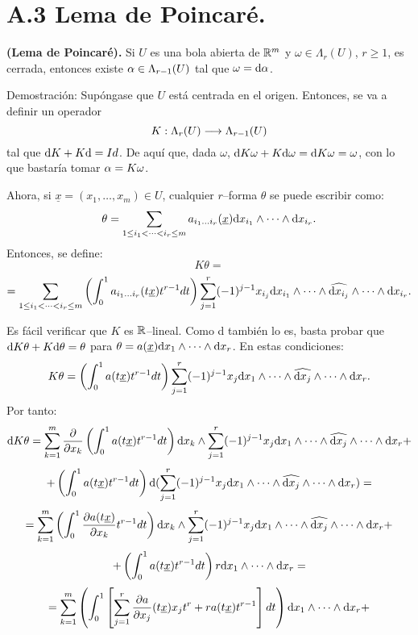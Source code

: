 \documentclass[cursovd_portada.tex]{subfiles}
\begin{document}
\section*{A.3 Lema de Poincaré.}
\begin{teoap}
{\bf (Lema de Poincaré).} Si $U$ es una bola abierta de $\mathbb{R}^m$ y $\omega\in \Lambda_r(U)$, $r\geq 1$, es cerrada,
entonces existe $\alpha\in\Lambda_{r-1}(U)$ tal que $\omega={\rm d} \alpha$.
\end{teoap}
{\sc Demostración:} Supóngase que $U$ está centrada en el origen. Entonces, se va a definir un operador
$$K:\Lambda_r(U)\longrightarrow\Lambda_{r-1}(U)$$
tal que ${\rm d} K+K{\rm d} =Id$. De aquí que, dada $\omega$, ${\rm d} K\omega+ K{\rm d} \omega={\rm d} K\omega=\omega$, con lo que
bastaría tomar $\alpha=K\omega$.
\par
Ahora, si $\underline{x}=(x_1,\dots ,x_m)\in U$, cualquier $r$--forma $\theta$ se puede escribir como:
$$\theta=\sum_{1\leq i_1 <\cdots <i_r\leq m}a_{i_1\dots i_r}(\underline{x})
{\rm d} x_{i_1}\wedge\cdots\wedge{\rm d} x_{i_r}.$$ \hs Entonces, se define:
$$K\theta=$$
$$=\sum_{1\leq i_1 <\cdots <i_r\leq m}\left( \int_0^1 a_{i_1\dots i_r}(t\underline{x})t^{r-1}dt\right)
\sum_{j=1}^r(-1)^ {j-1}x_{i_j}{\rm d} x_{i_1}\wedge\cdots\wedge\widehat{{\rm d} x_{i_j}}\wedge \cdots\wedge{\rm d} x_{i_r}.$$
\par\medskip
Es fácil verificar que $K$ es $\mathbb{R}$--lineal. Como d también lo es, basta probar que ${\rm d} K\theta+K{\rm d} \theta=\theta$ para $\theta=a(\underline{x}) {\rm d} x_1\wedge\cdots\wedge{\rm d} x_r$. En estas condiciones:
$$K\theta=\left( \int_0^1 a(t\underline{x})t^{r-1}dt\right) \sum_{j=1}^r(-1)^
{j-1}x_j{\rm d} x_1\wedge\cdots\wedge\widehat{{\rm d} x_j}\wedge\cdots\wedge {\rm d} x_r.$$ \hs Por tanto:
$${\rm d} K\theta=\sum_{k=1}^m\displaystyle{\frac{\partial}{\partial x_k}}\left( \int_0^1 a(t\underline{x})t^{r-1}
dt\right){\rm d} x_k\wedge\sum_{j=1}^r(-1)^{j-1}x_j{\rm d} x_1\wedge\cdots\wedge \widehat{{\rm d} x_j}\wedge\cdots\wedge{\rm d} x_r+$$
$$+\left( \int_0^1 a(t\underline{x})t^{r-1}dt\right) {\rm d} (\sum_{j=1}^r(-1)^
{j-1}x_j{\rm d} x_1\wedge\cdots\wedge\widehat{{\rm d} x_j}\wedge\cdots \wedge{\rm d} x_r)=$$
$$=\sum_{k=1}^m\left( \int_0^1 \displaystyle{\frac{\partial a(t\underline{x})}{\partial x_k}}t^{r-1}
dt\right){\rm d} x_k\wedge\sum_{j=1}^r(-1)^{j-1}x_j{\rm d} x_1\wedge\cdots\wedge \widehat{{\rm d} x_j}\wedge\cdots\wedge{\rm d} x_r+$$
$$+\left( \int_0^1 a(t\underline{x})t^{r-1}dt\right) r{\rm d} x_1\wedge\cdots
\wedge{\rm d} x_r=$$
$$=\sum_{k=1}^m\left( \int_0^1 \left[ \sum_{j=1}^r\displaystyle{\frac{\partial a}{\partial x_j}}(t\underline{x})
x_jt^r+ra(t\underline{x})t^{r-1}\right] dt\right) {\rm d} x_1\wedge\cdots\wedge {\rm d} x_r+$$
\end{document}
